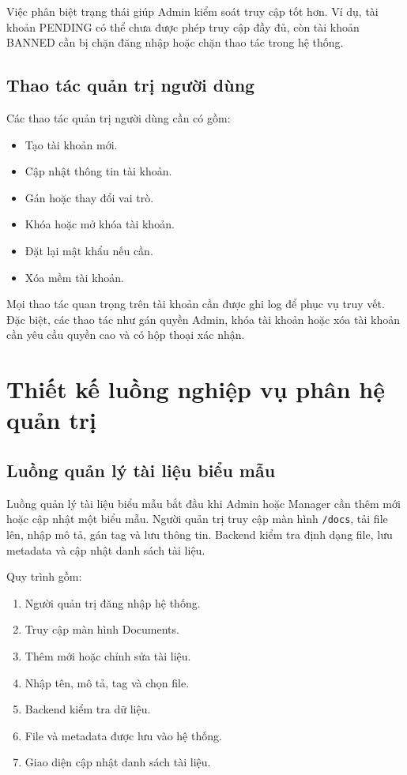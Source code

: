 Việc phân biệt trạng thái giúp Admin kiểm soát truy cập tốt hơn. Ví dụ, tài khoản PENDING có thể chưa được phép truy cập đầy đủ, còn tài khoản BANNED cần bị chặn đăng nhập hoặc chặn thao tác trong hệ thống.

\subsection{Thao tác quản trị người dùng}

Các thao tác quản trị người dùng cần có gồm:

\begin{itemize}
    \item Tạo tài khoản mới.
    \item Cập nhật thông tin tài khoản.
    \item Gán hoặc thay đổi vai trò.
    \item Khóa hoặc mở khóa tài khoản.
    \item Đặt lại mật khẩu nếu cần.
    \item Xóa mềm tài khoản.
\end{itemize}

Mọi thao tác quan trọng trên tài khoản cần được ghi log để phục vụ truy vết. Đặc biệt, các thao tác như gán quyền Admin, khóa tài khoản hoặc xóa tài khoản cần yêu cầu quyền cao và có hộp thoại xác nhận.

\section{Thiết kế luồng nghiệp vụ phân hệ quản trị}

\subsection{Luồng quản lý tài liệu biểu mẫu}

Luồng quản lý tài liệu biểu mẫu bắt đầu khi Admin hoặc Manager cần thêm mới hoặc cập nhật một biểu mẫu. Người quản trị truy cập màn hình \texttt{/docs}, tải file lên, nhập mô tả, gán tag và lưu thông tin. Backend kiểm tra định dạng file, lưu metadata và cập nhật danh sách tài liệu.

Quy trình gồm:

\begin{enumerate}
    \item Người quản trị đăng nhập hệ thống.
    \item Truy cập màn hình Documents.
    \item Thêm mới hoặc chỉnh sửa tài liệu.
    \item Nhập tên, mô tả, tag và chọn file.
    \item Backend kiểm tra dữ liệu.
    \item File và metadata được lưu vào hệ thống.
    \item Giao diện cập nhật danh sách tài liệu.
\end{enumerate}

